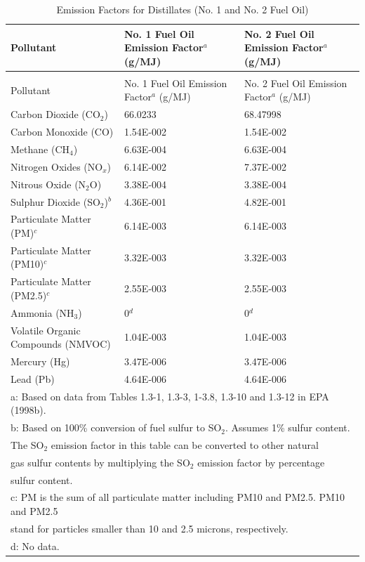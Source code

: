 \begin{longtable}[c]{p{3.0in}p{1.5in}p{1.5in}}
\caption{Emission Factors for Distillates (No. 1 and No. 2 Fuel Oil) \label{table:emission-factors-for-distillates-no.-1}} \tabularnewline
\toprule 
Pollutant & No. 1 Fuel Oil Emission Factor\(^a\)   (g/MJ) & No. 2 Fuel Oil Emission Factor\(^a\)   (g/MJ) \tabularnewline
\midrule
\endfirsthead

\caption[]{Emission Factors for Distillates (No. 1 and No. 2 Fuel Oil)} \tabularnewline
\toprule 
Pollutant & No. 1 Fuel Oil Emission Factor\(^a\)   (g/MJ) & No. 2 Fuel Oil Emission Factor\(^a\)   (g/MJ) \tabularnewline
\midrule
\endhead

Carbon Dioxide (CO\(_2\)) & 66.0233 & 68.47998 \tabularnewline
Carbon Monoxide (CO) & 1.54E-002 & 1.54E-002 \tabularnewline
Methane (CH\(_4\)) & 6.63E-004 & 6.63E-004 \tabularnewline
Nitrogen Oxides (NO\(_x\)) & 6.14E-002 & 7.37E-002 \tabularnewline
Nitrous Oxide (N\(_2\)O) & 3.38E-004 & 3.38E-004 \tabularnewline
Sulphur Dioxide (SO\(_2\))\(^b\) & 4.36E-001 & 4.82E-001 \tabularnewline
Particulate Matter (PM)\(^c\) & 6.14E-003 & 6.14E-003 \tabularnewline
Particulate Matter (PM10)\(^c\) & 3.32E-003 & 3.32E-003 \tabularnewline
Particulate Matter (PM2.5)\(^c\) & 2.55E-003 & 2.55E-003 \tabularnewline
Ammonia (NH\(_3\)) & 0\(^d\) & 0\(^d\) \tabularnewline
Volatile Organic Compounds (NMVOC) & 1.04E-003 & 1.04E-003 \tabularnewline
Mercury (Hg) & 3.47E-006 & 3.47E-006 \tabularnewline
Lead (Pb) & 4.64E-006 & 4.64E-006 \tabularnewline
\midrule
\multicolumn{3}{l}{a: Based on data from Tables 1.3-1, 1.3-3, 1-3.8, 1.3-10 and 1.3-12 in EPA (1998b).} \tabularnewline
\multicolumn{3}{l}{b: Based on 100\% conversion of fuel sulfur to SO\(_2\). Assumes 1\% sulfur content.} \tabularnewline
\multicolumn{3}{l}{The SO\(_2\) emission factor in this table can be converted to other natural} \tabularnewline
\multicolumn{3}{l}{gas sulfur contents by multiplying the SO\(_2\) emission factor by percentage} \tabularnewline
\multicolumn{3}{l}{sulfur content.} \tabularnewline
\multicolumn{3}{l}{c: PM is the sum of all particulate matter including PM10 and PM2.5. PM10 and PM2.5} \tabularnewline
\multicolumn{3}{l}{stand for particles smaller than 10 and 2.5 microns, respectively.} \tabularnewline
\multicolumn{3}{l}{d: No data.} \tabularnewline
\bottomrule
\end{longtable}

